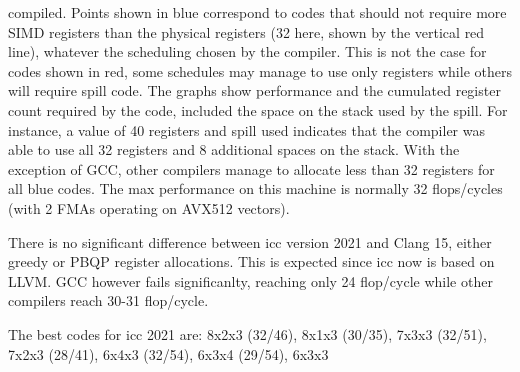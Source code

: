 \documentclass[sigconf,review]{acmart}
\begin{document}
compiled. Points shown in blue correspond to codes that should not require
more SIMD registers than the physical registers (32 here, shown by the vertical red line), whatever
the scheduling chosen by the compiler. This is not the case for codes
shown in red, some schedules may manage to use only registers while
others will require spill code. The graphs show performance and the
cumulated register count required by the code, included the space on
the stack used by the spill. For instance, a value of 40 registers and
spill used indicates that the compiler was able to use all 32
registers and 8 additional spaces on the stack. With the exception of
GCC, other compilers manage to allocate less than 32 registers for all
blue codes. The max performance on this machine is normally 32 flops/cycles (with 2 FMAs operating on AVX512 vectors).  

There is no significant difference between icc version 2021 and Clang 15, either greedy or PBQP register allocations. This is expected since icc now is based on LLVM. GCC however fails significanlty, reaching  only 24 flop/cycle while other compilers reach 30-31 flop/cycle. 

The best codes for icc 2021 are: 8x2x3 (32/46), 8x1x3 (30/35), 7x3x3 (32/51), 7x2x3 (28/41), 6x4x3 (32/54), 6x3x4 (29/54), 6x3x3
\end{document}
